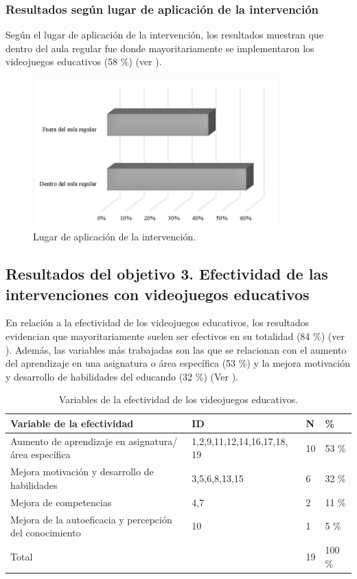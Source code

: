 \documentclass[spanish]{textolivre}
\begin{document}
\subsubsection{Resultados según lugar de aplicación de la intervención}
Según el lugar de aplicación de la intervención, los resultados muestran que dentro del aula regular fue donde mayoritariamente se implementaron los videojuegos educativos (58 \%) (ver ).

\begin{figure}[htbp]
 \centering
 \includegraphics[width=0.85\textwidth]{Fig2.jpg}
 \caption{Lugar de aplicación de la intervención.}
 \label{fig02}
\end{figure}

\subsection{Resultados del objetivo 3.  Efectividad de las intervenciones con videojuegos educativos}\label{sec-secoes}
En relación a la efectividad de los videojuegos educativos, los resultados evidencian que mayoritariamente suelen ser efectivos en su totalidad (84 \%) (ver ). Además, las variables más trabajadas son las que se relacionan con el aumento del aprendizaje en una asignatura o área específica (53 \%) y la mejora motivación y desarrollo de habilidades del educando (32 \%) (Ver ).

\begin{table}[htbp]
\caption{Variables de la efectividad de los videojuegos educativos.}
\label{tbl10}
\centering
\begin{tabular}{p{7.7cm} l l l}
\toprule 
\textbf{Variable de la efectividad} & \textbf{ID} & \textbf{N} & \textbf{\%}
\\
\midrule
Aumento de aprendizaje en asignatura/ área específica & 1,2,9,11,12,14,16,17,18, 19 & 10 & 53 \%
\\
Mejora motivación y desarrollo de habilidades & 3,5,6,8,13,15 & 6 & 32 \%
\\
Mejora de competencias & 4,7 & 2 & 11 \%
\\
Mejora de la autoeficacia y percepción del conocimiento & 10 & 1 & 5 \%
\\
Total & & 19 & 100 \%
\\
\bottomrule
\end{tabular}
\end{table}
\end{document}
